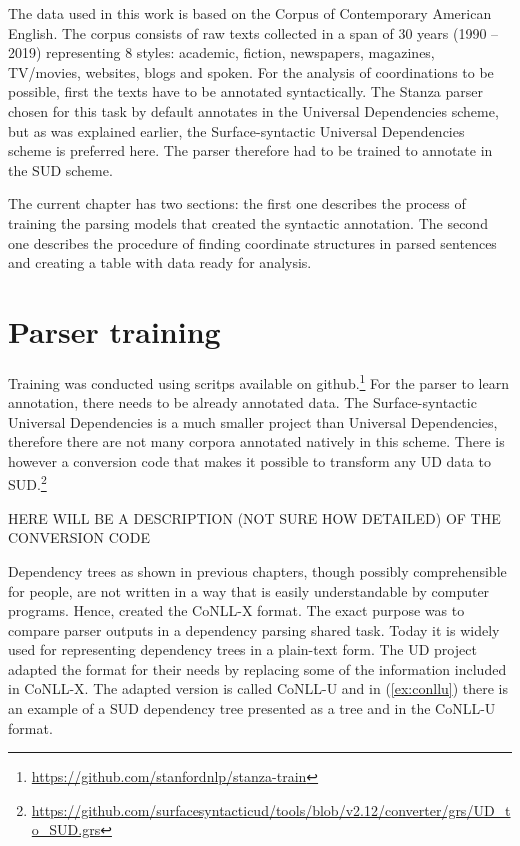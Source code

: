 
The data used in this work is based on the Corpus of Contemporary American English. The corpus consists of raw texts collected in a span of 30 years (1990 -- 2019) representing 8 styles: academic, fiction, newspapers, magazines, TV/movies, websites, blogs and spoken. For the analysis of coordinations to be possible, first the texts have to be annotated syntactically. The Stanza parser chosen for this task by default annotates in the Universal Dependencies scheme, but as was explained earlier, the Surface-syntactic Universal Dependencies scheme is preferred here. The parser therefore had to be trained to annotate in the SUD scheme. 

The current chapter has two sections: the first one describes the process of training the parsing models that created the syntactic annotation. The second one describes the procedure of finding coordinate structures in parsed sentences and creating a table with data ready for analysis. 

\section{Parser training}
Training was conducted using scritps available on github.\footnote{\url{https://github.com/stanfordnlp/stanza-train}} For the parser to learn annotation, there needs to be already annotated data. The Surface-syntactic Universal Dependencies is a much smaller project than Universal Dependencies, therefore there are not many corpora annotated natively in this scheme. There is however a conversion code that makes it possible to transform any UD data to SUD.\footnote{\url{https://github.com/surfacesyntacticud/tools/blob/v2.12/converter/grs/UD_to_SUD.grs}} 

HERE WILL BE A DESCRIPTION (NOT SURE HOW DETAILED) OF THE CONVERSION CODE

Dependency trees as shown in previous chapters, though possibly comprehensible for people, are not written in a way that is easily understandable by computer programs. Hence, \cite{buchholz-marsi-2006-conll} created the CoNLL-X format. The exact purpose was to compare parser outputs in a dependency parsing shared task. Today it is widely used for representing dependency trees in a plain-text form. The UD project adapted the format for their needs by replacing some of the information included in CoNLL-X. The adapted version is called CoNLL-U and in (\ref{ex:conllu}) there is an example of a SUD dependency tree presented as a tree and in the CoNLL-U format. 

